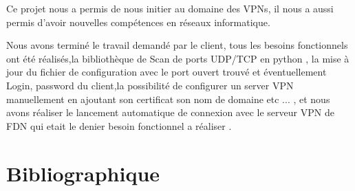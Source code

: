 \documentclass[12pt,a4paper]{article}
\begin{document}
Ce projet nous a permis de nous initier au domaine des VPNs, il nous a aussi permis d'avoir nouvelles compétences en réseaux informatique. 

Nous avons terminé le travail demandé par le client, tous les besoins fonctionnels ont été réalisés,la   bibliothèque de Scan de ports UDP/TCP en python , la mise à jour du fichier de configuration avec le port ouvert trouvé et éventuellement Login, password du client,la possibilité de configurer un server VPN manuellement en ajoutant son certificat  son nom de domaine etc ... , et nous avons réaliser le lancement automatique de connexion avec le serveur VPN de FDN qui etait le denier besoin fonctionnel a réaliser .\\
\begin{flushleft}
\end{flushleft}
\newpage

\section{Bibliographique}

\nocite{*}

\end{document}
